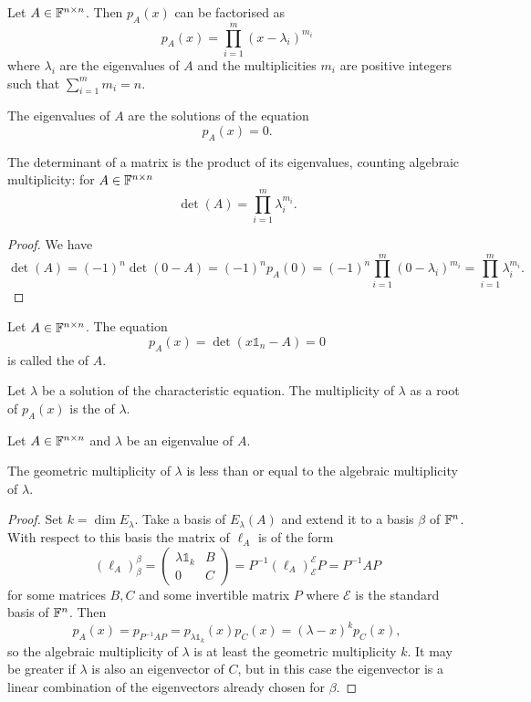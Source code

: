 \begin{proposition}
Let $A\in\mathbb{F}^{n\times n}$. Then $p_A(x)$ can be factorised as
\[ p_A(x) = \prod_{i=1}^m (x - \lambda_i)^{m_i}  \]
where $\lambda_i$ are the eigenvalues of $A$ and the multiplicities $m_i$ are positive integers such that $\sum_{i=1}^m m_i = n$.
\end{proposition}
\begin{corollary}
The eigenvalues of $A$ are the solutions of the equation
\[ p_A(x) = 0. \]
\end{corollary}
\begin{corollary}
The determinant of a matrix is the product of its eigenvalues, counting algebraic multiplicity: for $A\in\mathbb{F}^{n\times n}$
\[ \det(A) = \prod_{i=1}^m\lambda_i^{m_i}. \]
\end{corollary}
\begin{proof}
We have
\[ \det(A) = (-1)^n\det(0-A) = (-1)^np_A(0) = (-1)^n\prod_{i=1}^m(0 - \lambda_i)^{m_i} = \prod_{i=1}^m\lambda_i^{m_i}. \]
\end{proof}

\begin{definition}
Let $A\in\mathbb{F}^{n\times n}$. The equation
\[ p_A(x) = \det(x\mathbb{1}_n - A) = 0 \]
is called the  of $A$.

Let $\lambda$ be a solution of the characteristic equation. The multiplicity of $\lambda$ as a root of $p_A(x)$ is the  of $\lambda$.
\end{definition}
\begin{lemma}
Let $A\in\mathbb{F}^{n\times n}$ and $\lambda$ be an eigenvalue of $A$.

The geometric multiplicity of $\lambda$ is less than or equal to the algebraic multiplicity of $\lambda$.
\end{lemma}
\begin{proof}
Set $k=\dim E_\lambda$. Take a basis of $E_\lambda(A)$ and extend it to a basis $\beta$ of $\mathbb{F}^{n}$. With respect to this basis the matrix of $\ell_A$ is of the form
\[ (\ell_A)_\beta^\beta =  \begin{pmatrix}
\lambda \mathbb{1}_k & B \\ 0 & C
\end{pmatrix} = P^{-1}(\ell_A)_\mathcal{E}^\mathcal{E}P = P^{-1}AP \]
for some matrices $B,C$ and some invertible matrix $P$ where $\mathcal{E}$ is the standard basis of $\mathbb{F}^n$. Then 
\[ p_A(x)= p_{P^{-1}AP} = p_{\lambda \mathbb{1}_{k}}(x)p_C(x) = (\lambda - x)^kp_C(x), \]
so the algebraic multiplicity of $\lambda$ is at least the geometric multiplicity $k$. It may be greater if $\lambda$ is also an eigenvector of $C$, but in this case the eigenvector is a linear combination of the eigenvectors already chosen for $\beta$.
\end{proof}

